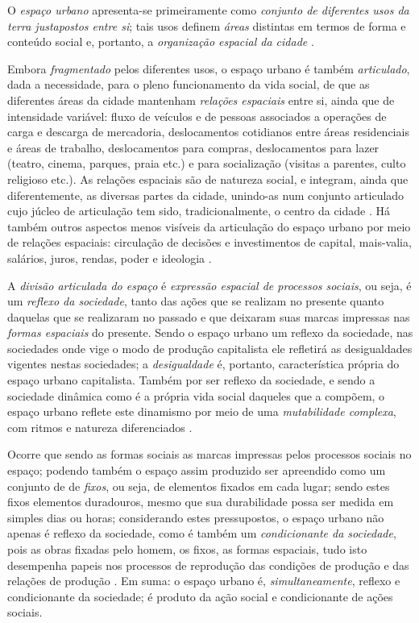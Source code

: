 O \textit{espaço urbano} apresenta-se primeiramente como \textit{conjunto de diferentes usos da terra justapostos entre si}; tais usos definem \textit{áreas} distintas em termos de forma e conteúdo social e, portanto, a \textit{organização espacial da cidade} \cite[p.~7]{CORREA1985espa}. 

Embora \textit{fragmentado} pelos diferentes usos, o espaço urbano é também \textit{articulado}, dada a necessidade, para o pleno funcionamento da vida social, de que as diferentes áreas da cidade mantenham \textit{relações espaciais} entre si, ainda que de intensidade variável: fluxo de veículos e de pessoas associados a operações de carga e descarga de mercadoria, deslocamentos cotidianos entre áreas residenciais e áreas de trabalho, deslocamentos para compras, deslocamentos para lazer (teatro, cinema, parques, praia etc.) e para socialização (visitas a parentes, culto religioso etc.). As relações espaciais são de natureza social, e integram, ainda que diferentemente, as diversas partes da cidade, unindo-as num conjunto articulado cujo júcleo de articulação tem sido, tradicionalmente, o centro da cidade \cite[p.~7-8]{CORREA1985espa}. Há também outros aspectos menos visíveis da articulação do espaço urbano por meio de relações espaciais: circulação de decisões e investimentos de capital, mais-valia, salários, juros, rendas, poder e ideologia \cite[p.~147]{CORREA1997}.

A \textit{divisão articulada do espaço} é \textit{expressão espacial de processos sociais}, ou seja, é um \textit{reflexo da sociedade}, tanto das ações que se realizam no presente quanto daquelas que se realizaram no passado e que deixaram suas marcas impressas nas \textit{formas espaciais} do presente. Sendo o espaço urbano um reflexo da sociedade, nas sociedades onde vige o modo de produção capitalista ele refletirá as desigualdades vigentes nestas sociedades; a \textit{desigualdade} é, portanto, característica própria do espaço urbano capitalista. Também por ser reflexo da sociedade, e sendo a sociedade dinâmica como é a própria vida social daqueles que a compõem, o espaço urbano reflete este dinamismo por meio de uma \textit{mutabilidade complexa}, com ritmos e natureza diferenciados \cite[p.~8]{CORREA1985espa}.

Ocorre que sendo as formas sociais as marcas impressas pelos processos sociais no espaço; podendo também o espaço assim produzido ser apreendido como um conjunto de de \textit{fixos}, ou seja, de elementos fixados em cada lugar; sendo estes fixos elementos duradouros, mesmo que sua durabilidade possa ser medida em simples dias ou horas; considerando estes pressupostos, o espaço urbano não apenas é reflexo da sociedade, como é também um \textit{condicionante da sociedade}, pois as obras fixadas pelo homem, os fixos, as formas espaciais, tudo isto desempenha papeis nos processos de reprodução das condições de produção e das relações de produção \cite[p.~8]{CORREA1985espa}. Em suma: o espaço urbano é, \textit{simultaneamente}, reflexo e condicionante da sociedade; é produto da ação social e condicionante de ações sociais. 

